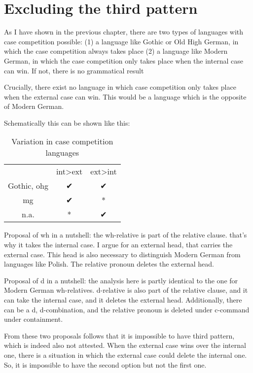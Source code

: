 
\chapter{Excluding the third pattern}\label{ch:relativization}

As I have shown in the previous chapter, there are two types of languages with case competition possible:
(1) a language like Gothic or Old High German, in which the case competition always takes place
(2) a language like Modern German, in which the case competition only takes place when the internal case can win. If not, there is no grammatical result

Crucially, there exist no language in which case competition only takes place when the external case can win. This would be a language which is the opposite of Modern German.

Schematically this can be shown like this:

\begin{table}[H]
 \center
 \caption {Variation in case competition languages}
  \begin{tabular}{ccc}
  \toprule
        & \ac{int}>\ac{ext}  & \ac{ext}>\ac{int} \\
        \cmidrule{2-3}
  Gothic, \ac{ohg} & ✔          & ✔         \\
  \ac{mg}  & ✔           & *         \\
  n.a.     & *          & ✔         \\
  \bottomrule
  \end{tabular}
\end{table}

Proposal of wh in a nutshell: the wh-relative is part of the relative clause. that's why it takes the internal case. I argue for an external head, that carries the external case. This head is also necessary to distinguish Modern German from languages like Polish. The relative pronoun deletes the external head.

Proposal of d in a nutshell: the analysis here is partly identical to the one for Modern German wh-relatives. d-relative is also part of the relative clause, and it can take the internal case, and it deletes the external head. Additionally, there can be a d, d-combination, and the relative pronoun is deleted under c-command under containment.

From these two proposals follows that it is impossible to have third pattern, which is indeed also not attested. When the external case wins over the internal one, there is a situation in which the external case could delete the internal one. So, it is impossible to have the second option but not the first one.

